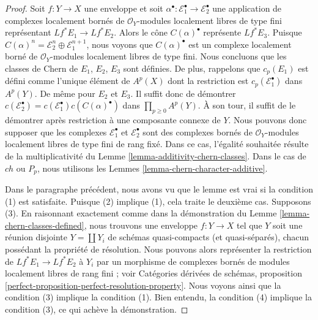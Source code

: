 \begin{proof}
Soit $f : Y \to X$ une enveloppe et soit
$\alpha^\bullet : \mathcal{E}_1^\bullet \to \mathcal{E}_2^\bullet$
une application de complexes localement bornés de
$\mathcal{O}_Y$-modules localement libres de type fini représentant $Lf^*E_1 \to Lf^*E_2$.
Alors le cône $C(\alpha)^\bullet$ représente $Lf^*E_3$. Puisque
$C(\alpha)^n = \mathcal{E}_2^n \oplus \mathcal{E}_1^{n + 1}$,
nous voyons que $C(\alpha)^\bullet$ est un complexe localement borné
de $\mathcal{O}_Y$-modules localement libres de type fini.
Nous concluons que les classes de Chern de $E_1$, $E_2$, $E_3$
sont définies. De plus, rappelons que $c_p(E_1)$ est défini
comme l'unique élément de $A^p(X)$ dont la restriction est
$c_p(\mathcal{E}_1^\bullet)$ dans $A^p(Y)$. De même pour
$E_2$ et $E_3$. Il suffit donc
de démontrer $c(\mathcal{E}_2^\bullet) =
c(\mathcal{E}_1^\bullet) c(C(\alpha)^\bullet)$
dans $\prod_{p \geq 0} A^p(Y)$.
À son tour, il suffit de le démontrer après restriction
à une composante connexe de $Y$. Nous pouvons donc supposer que
les complexes $\mathcal{E}_1^\bullet$ et $\mathcal{E}_2^\bullet$
sont des complexes bornés de $\mathcal{O}_Y$-modules localement libres de type fini
de rang fixé. Dans ce cas, l'égalité souhaitée résulte de la
multiplicativité du Lemme \ref{lemma-additivity-chern-classes}.
Dans le cas de $ch$ ou $P_p$, nous utilisons les
Lemmes \ref{lemma-chern-character-additive}.

\medskip\noindent
Dans le paragraphe précédent, nous avons vu que le lemme est vrai si
la condition (1) est satisfaite. Puisque (2) implique (1), cela traite
le deuxième cas. Supposons (3). En raisonnant exactement comme dans la démonstration du
Lemme \ref{lemma-chern-classes-defined}, nous trouvons une enveloppe
$f : Y \to X$ tel que $Y$ soit une réunion disjointe $Y = \coprod Y_i$
de schémas quasi-compacts (et quasi-séparés), chacun possédant la
propriété de résolution. Nous pouvons alors représenter la restriction de
$Lf^*E_1 \to Lf^*E_2$ à $Y_i$ par un morphisme de complexes bornés
de modules localement libres de rang fini ; voir
Catégories dérivées de schémas, proposition
\ref{perfect-proposition-perfect-resolution-property}.
Nous voyons ainsi que la condition (3) implique la condition (1).
Bien entendu, la condition (4) implique la condition (3), ce qui achève
la démonstration.
\end{proof}

